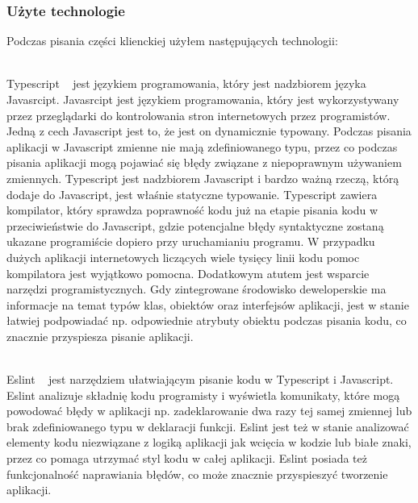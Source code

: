 \subsubsection{Użyte technologie}
Podczas pisania części klienckiej użyłem następujących technologii:
\begin{description}[leftmargin={15pt},labelindent={0pt}]
  \item[Typescript] \hfill \\ Typescript ~\cite{ref_ts_doc} jest językiem programowania, który jest nadzbiorem języka Javasrcipt. Javasrcipt jest językiem programowania, który jest wykorzystywany przez przeglądarki do kontrolowania stron internetowych przez programistów. Jedną z cech Javascript jest to, że jest on dynamicznie typowany. Podczas pisania aplikacji w Javascript zmienne nie mają zdefiniowanego typu, przez co podczas pisania aplikacji mogą pojawiać się błędy związane z niepoprawnym używaniem zmiennych. Typescript jest nadzbiorem Javascript i bardzo ważną rzeczą, którą dodaje do Javascript, jest właśnie statyczne typowanie. Typescript zawiera kompilator, który sprawdza poprawność kodu już na etapie pisania kodu w przeciwieństwie do Javascript, gdzie potencjalne błędy syntaktyczne zostaną ukazane programiście dopiero przy uruchamianiu programu. W przypadku dużych aplikacji internetowych liczących wiele tysięcy linii kodu pomoc kompilatora jest wyjątkowo pomocna. Dodatkowym atutem jest wsparcie narzędzi programistycznych. Gdy zintegrowane środowisko deweloperskie ma informacje na temat typów klas, obiektów oraz interfejsów aplikacji, jest w stanie łatwiej podpowiadać np. odpowiednie atrybuty obiektu podczas pisania kodu, co znacznie przyspiesza pisanie aplikacji.

  \vspace{0.4cm}

  \item[Eslint] \hfill \\ Eslint ~\cite{ref_eslint_doc} jest narzędziem ułatwiającym pisanie kodu w Typescript i Javascript. Eslint analizuje składnię kodu programisty i wyświetla komunikaty, które mogą powodować błędy w aplikacji np. zadeklarowanie dwa razy tej samej zmiennej lub brak zdefiniowanego typu w deklaracji funkcji. Eslint jest też w stanie analizować elementy kodu niezwiązane z logiką aplikacji jak wcięcia w kodzie lub białe znaki, przez co pomaga utrzymać styl kodu w całej aplikacji. Eslint posiada też funkcjonalność naprawiania błędów, co może znacznie przyspieszyć tworzenie aplikacji.

  \vspace{0.4cm}


\end{description}
